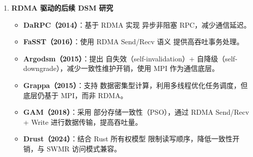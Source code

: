 {\begin{enumerate}[leftmargin=1em, align=left]
          2014 年，微软 FaRM\citep{drago2014farm} 首次结合 RDMA + DSM，替代 TCP/IP，显著降低通信延迟，提升吞吐量，引发后续研究。

          \begin{itemize}
            \item RDMA 的优势：
                  \begin{itemize}
                    \item 零拷贝（避免 CPU 处理数据传输）。
                    \item 低延迟、高吞吐（远优于传统 TCP/IP）。
                  \end{itemize}
            \item FaRM 贡献：
                  \begin{itemize}
                    \item 证明 RDMA + DSM 组合的可行性，推动 RDMA 在 DSM 研究中的应用。
                  \end{itemize}
          \end{itemize}
    \item \textbf{RDMA 驱动的后续 DSM 研究}

          \begin{itemize}
            \item \textbf{DaRPC（2014）}：基于 RDMA 实现 异步非阻塞 RPC，减少通信延迟。
            \item \textbf{FaSST（2016）}：使用 RDMA Send/Recv 语义 提供高吞吐事务处理。
            \item \textbf{Argodsm（2015）}：提出 自失效（self-invalidation）+ 自降级（self-downgrade），减少一致性维护开销，使用 MPI 作为通信底层。
            \item \textbf{Grappa（2015）}：支持 数据密集型计算，利用多线程优化任务调度，但底层仍基于 MPI，而非 RDMA。
            \item \textbf{GAM（2018）}：采用 部分存储一致性（PSO），通过 RDMA Send/Recv + Write 进行数据传输，提高吞吐量。
            \item \textbf{Drust（2024）}：结合 Rust 所有权模型 限制读写顺序，降低一致性开销，与 SWMR 访问模式兼容。
          \end{itemize}


\end{enumerate}}
